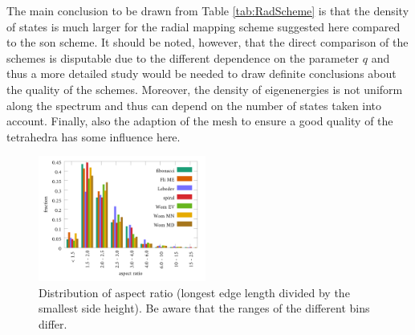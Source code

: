 The main conclusion to be drawn from Table \ref{tab:RadScheme} is that the density of states is much larger for the radial mapping scheme suggested here compared to the son scheme.
It should be noted, however, that the direct comparison of the schemes is disputable due to the different dependence on the parameter $q$ and thus a more detailed study would be needed to draw definite conclusions about the quality of the schemes.
Moreover, the density of eigenenergies is not uniform along the spectrum and thus can depend on the number of states taken into account.
Finally, also the adaption of the mesh to ensure a good quality of the tetrahedra has some influence here.
\begin{figure}
\includegraphics[width=0.49\textwidth]{Figures/Sph_hist.pdf}
\caption{Distribution of aspect ratio (longest edge length divided by the smallest side height).
   Be aware that the ranges of the different bins differ.}
\end{figure}

